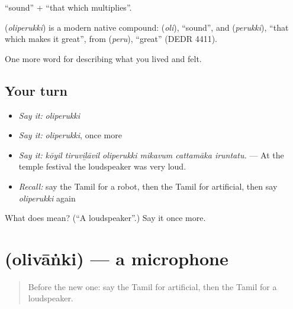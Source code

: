  \textquotedblleft{}sound\textquotedblright{} +  \textquotedblleft{}that which multiplies\textquotedblright{}.

\begin{cousinweb}
\textbf{} (\emph{oliperukki}) is a modern native compound:  (\emph{oli}), \textquotedblleft{}sound\textquotedblright{}, and  (\emph{perukki}), \textquotedblleft{}that which makes it great\textquotedblright{}, from  (\emph{peru}), \textquotedblleft{}great\textquotedblright{} (DEDR 4411).
\end{cousinweb}

\begin{grammarlens}[title={What you've built}]
One more word for describing what you lived and felt.
\end{grammarlens}

\subsection*{Your turn}
\begin{itemize}
\raggedright
  \item \emph{Say it:} \emph{oliperukki}
  \item \emph{Say it:} \emph{oliperukki}, once more
  \item \emph{Say it:} \emph{kōyil tiruviḻāvil oliperukki mikavum cattamāka iruntatu.} — At the temple festival the loudspeaker was very loud.
  \item \emph{Recall:} say the Tamil for a robot, then the Tamil for artificial, then say \emph{oliperukki} again
\end{itemize}

\begin{tcolorbox}[breakable,colback=teal!4,colframe=teal!35!black,title={Before you move on}]
What does  mean? (\textquotedblleft{}A loudspeaker\textquotedblright{}.) Say it once more.
\end{tcolorbox}
\section[\texorpdfstring{\ta{ஒலிவாங்கி} (olivāṅki)}{ஒலிவாங்கி (olivāṅki)}]{ (olivāṅki) — a microphone}

\label{lesson:TA-C519-olivanki}



\begin{quote}
Before the new one: say the Tamil for artificial, then the Tamil for a loudspeaker.
\end{quote}

